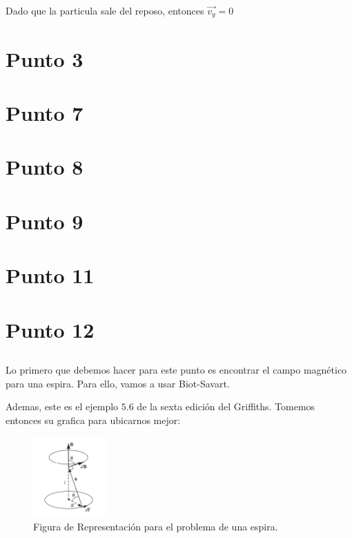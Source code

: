 \documentclass{report}
\begin{document}
Dado que la particula sale del reposo, entonces $\vec{v_y} = 0$

\section{}

\section{}

\chapter{Punto 3}

\chapter{Punto 7}

\chapter{Punto 8}

\chapter{Punto 9}

\chapter{Punto 11}

\chapter{Punto 12}

\section{}

Lo primero que debemos hacer para este punto es encontrar el campo magnético para una espira. Para ello, vamos a usar Biot-Savart.


Ademas, este es el ejemplo $5.6$ de la sexta edición del Griffiths. Tomemos entonces su grafica para ubicarnos mejor:

\begin{figure}[h]
	\begin{center}
		\includegraphics[width=0.25\textwidth]{img/book_5_21.png}
	\end{center}
	\caption{Figura de Representación para el problema de una espira.}\label{fig:Fig_5_21}
\end{figure}
\end{document}
